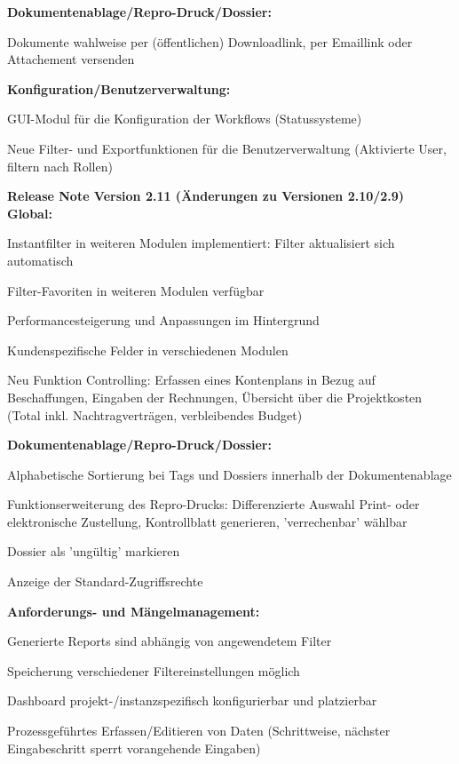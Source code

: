 \textbf{Dokumentenablage/Repro-Druck/Dossier:}
\begin{compactitem}
  \item Dokumente wahlweise per (öffentlichen) Downloadlink, per Emaillink oder Attachement versenden
\end{compactitem}

\textbf{Konfiguration/Benutzerverwaltung:}
\begin{compactitem}
  \item GUI-Modul für die Konfiguration der Workflows (Statussysteme)
	\item Neue Filter- und Exportfunktionen für die Benutzerverwaltung (Aktivierte User, filtern nach Rollen)
\end{compactitem}

\vspace{\baselineskip}

\textbf{Release Note Version 2.11 (Änderungen zu Versionen 2.10/2.9)} \\
\textbf{Global:}
\begin{compactitem}
	\item Instantfilter in weiteren Modulen implementiert: Filter aktualisiert sich automatisch 
	\item Filter-Favoriten in weiteren Modulen verfügbar
	\item Performancesteigerung und Anpassungen im Hintergrund
	\item Kundenspezifische Felder in verschiedenen Modulen
	\item Neu Funktion Controlling: Erfassen eines Kontenplans in Bezug auf Beschaffungen, Eingaben der Rechnungen, Übersicht über die Projektkosten (Total inkl. Nachtragverträgen, verbleibendes Budget)
\end{compactitem}

\textbf{Dokumentenablage/Repro-Druck/Dossier:}
\begin{compactitem}
	\item Alphabetische Sortierung bei Tags und Dossiers innerhalb der Dokumentenablage
	\item Funktionserweiterung des Repro-Drucks: Differenzierte Auswahl Print- oder elektronische Zustellung, Kontrollblatt generieren, 'verrechenbar' wählbar
	\item Dossier als 'ungültig' markieren
	\item Anzeige der Standard-Zugriffsrechte
\end{compactitem}

\textbf{Anforderungs- und Mängelmanagement:}
\begin{compactitem}
	\item Generierte Reports sind abhängig von angewendetem Filter
	\item Speicherung verschiedener Filtereinstellungen möglich
	\item Dashboard projekt-/instanzspezifisch konfigurierbar und platzierbar
	\item Prozessgeführtes Erfassen/Editieren von Daten (Schrittweise, nächster Eingabeschritt sperrt vorangehende Eingaben)
\end{compactitem}

